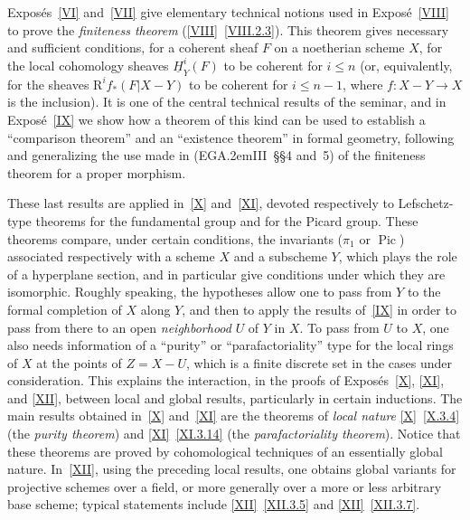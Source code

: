 \documentclass[11pt,a4paper,oneside]{book}
\providecommand{\pageoriginale}{%
  \refstepcounter{pageoriginal}%
  \marginpar{\raggedright\footnotesize\bfseries\thepageoriginal}%
  \xspace}
\providecommand{\og}{``}
\providecommand{\fg}{''\xspace}
\providecommand{\EGA}{\textup{EGA}\kern.2em}
\let\oldS\S
\providecommand{\sheaf}[1]{\underline{#1}}
\providecommand{\Pic}{\operatorname{Pic}}
\providecommand{\R}{\mathrm R}
\theoremstyle{plain}
\theoremstyle{definition}
\theoremstyle{remark}
\renewcommand{\Ref}[1]{\textup{\ref{#1}}}
\begin{document}
Expos\'es~\Ref{VI} and~\Ref{VII} give elementary technical notions used in
Expos\'e~\Ref{VIII} to prove the \emph{finiteness theorem}
(\Ref{VIII}~\Ref{VIII.2.3}). This theorem gives necessary and sufficient
conditions, for a coherent sheaf $F$ on a noetherian scheme $X$, for the
local cohomology sheaves $\sheaf{H}_Y^i(F)$ to be coherent for $i\leq n$
(or, equivalently, for the sheaves $\R^if_*(F|X-Y)$ to be coherent for
$i\leq n-1$, where $f\colon X-Y\to X$ is the inclusion). It is one of the
central technical results of the seminar, and in Expos\'e~\Ref{IX} we show
how a theorem of this kind can be used to establish a \og comparison
theorem\fg and an \og existence theorem\fg in formal geometry, following
and generalizing the use made in (\EGA III~\oldS\S 4 and~5) of the
finiteness theorem for a proper morphism.

These last results are applied in~\Ref{X} and~\Ref{XI}, devoted
respectively to Lefschetz-type theorems for the fundamental group and
for\pageoriginale the Picard group. These theorems compare, under certain
conditions, the invariants ($\pi_1$ or $\Pic$) associated respectively
with a scheme $X$ and a subscheme $Y$, which plays the role of a
hyperplane section, and in particular give conditions under which they
are isomorphic. Roughly speaking, the hypotheses allow one to pass from
$Y$ to the formal completion of $X$ along $Y$, and then to apply the
results of~\Ref{IX} in order to pass from there to an open
\emph{neighborhood} $U$ of $Y$ in $X$. To pass from $U$ to $X$, one also
needs information of a \og purity\fg or \og parafactoriality\fg type for
the local rings of $X$ at the points of $Z=X-U$, which is a finite
discrete set in the cases under consideration. This explains the
interaction, in the proofs of Expos\'es~\Ref{X}, \Ref{XI}, and \Ref{XII},
between local and global results, particularly in certain inductions. The
main results obtained in~\Ref{X} and~\Ref{XI} are the theorems of
\emph{local nature} \Ref{X}~\Ref{X.3.4} (the \emph{purity theorem}) and
\Ref{XI}~\Ref{XI.3.14} (the \emph{parafactoriality theorem}). Notice that
these theorems are proved by cohomological techniques of an essentially
global nature. In~\Ref{XII}, using the preceding local results, one
obtains global variants for projective schemes over a field, or more
generally over a more or less arbitrary base scheme; typical statements
include \Ref{XII}~\Ref{XII.3.5} and \Ref{XII}~\Ref{XII.3.7}.
\end{document}
